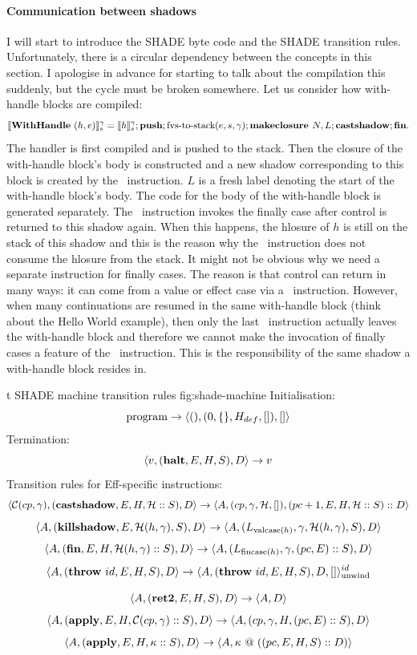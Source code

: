 \documentclass[class=article, crop=false]{standalone}
\begin{document}
\paragraph{Communication between shadows}
I will start to introduce the SHADE byte code and the SHADE transition rules.
Unfortunately, there is a circular dependency between the concepts in this
section. I apologise in advance for starting to talk about the compilation
this suddenly, but the cycle must be broken somewhere. Let us consider how
with-handle blocks are compiled:
$$ \llbracket \mathbf{WithHandle}\ (h, e) \rrbracket_s ^ \gamma = \llbracket h \rrbracket_s ^ \gamma; \textbf{push}; \text{fvs-to-stack}(e, s, \gamma); \textbf{makeclosure }N, L; \mathbf{castshadow}; \mathbf{fin}.$$
The handler is first compiled and is pushed to the stack. Then the closure of
the with-handle block's body is constructed and a new shadow corresponding to
this block is created by the \vmCastShadow\ instruction. $L$ is a fresh label
denoting the start of the with-handle block's body. The code for the body of
the with-handle block is generated separately. The \vmFin\ instruction invokes
the finally case after control is returned to this shadow again. When this
happens, the hlosure of $h$ is still on the stack of this shadow and this is
the reason why the \vmCastShadow\ instruction does not consume the hlosure from
the stack. It might not be obvious why we need a separate instruction for
finally cases. The reason is that control can return in many ways: it can come
from a value or effect case via a \vmRett\ instruction. However, when many
continuations are resumed in the same with-handle block (think about the Hello
World example), then only the last \vmRett\ instruction actually leaves the
with-handle block and therefore we cannot make the invocation of finally cases
a feature of the \vmRett\ instruction. This is the responsibility of the same
shadow a with-handle block resides in.

\begin{myfigure}[0.95]{t}
{SHADE machine transition rules}
{fig:shade-machine}
%
Initialisation:
$$\text{program} \to \langle \mathbf{()}, (0, \{\}, H_{def}, []), [] \rangle$$
%
Termination:
$$ \langle v, (\mathbf{halt}, E, H, S), D \rangle \to v $$
%
Transition rules for Eff-specific instructions:
$$ \langle \mathcal{C}(cp, \gamma), (\mathbf{castshadow}, E, H, \mathcal{H} :: S), D \rangle \to \langle A, (cp, \gamma, \mathcal{H}, []), (pc+1, E, H, \mathcal{H} :: S) :: D \rangle $$
$$ \langle A, (\mathbf{killshadow}, E, \mathcal{H}(h, \gamma), S), D \rangle \to  \langle A, (L_{\text{valcase}(h)}, \gamma, \mathcal{H}(h, \gamma),S), D \rangle $$
$$ \langle A, (\mathbf{fin}, E, H, \mathcal{H}(h, \gamma) :: S), D \rangle \to \langle A, (L_{\text{fincase}(h)}, \gamma, (pc, E) :: S), D \rangle $$
$$ \langle A, (\mathbf{throw}\ id, E, H, S), D \rangle \to \langle A, (\mathbf{throw}\ id, E, H, S), D, [] \rangle_\text{unwind}^{id} $$

$$ \langle A, (\mathbf{ret2}, E, H, S), D \rangle \to \langle A, D \rangle $$
$$ \langle A, (\mathbf{apply}, E, H, \mathcal{C}(cp, \gamma) :: S), D \rangle \to \langle A, (cp, \gamma, H, (pc, E) :: S), D \rangle $$
$$ \langle A, (\mathbf{apply}, E, H, \kappa :: S), D \rangle \to \langle A, \kappa\ @\ ((pc, E, H, S) :: D) \rangle $$
\end{myfigure}
\end{document}
